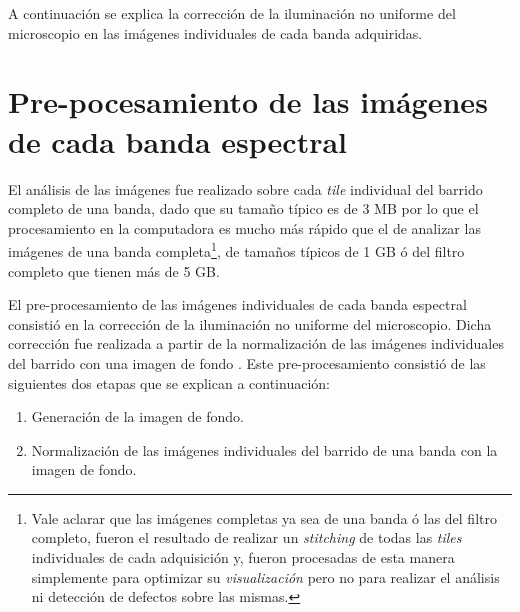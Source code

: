 A continuación se explica la corrección de la iluminación no uniforme del microscopio en las imágenes individuales de cada banda adquiridas.

\singlespacing
\section{Pre-pocesamiento de las imágenes de cada banda espectral }
\label{sec:preproc}

\hspace{0.5cm}El análisis de las imágenes fue realizado sobre cada \textit{tile} individual del barrido completo de una banda, dado que su tamaño típico es de 3 MB por lo que el procesamiento en la computadora es mucho más rápido que el de analizar las imágenes de una banda completa\footnote{Vale aclarar que las imágenes completas ya sea de una banda ó las del filtro completo, fueron el resultado de realizar un \textit{stitching} de todas las \textit{tiles} individuales de cada adquisición y, fueron procesadas de esta manera simplemente para optimizar su \textit{visualización} pero no para realizar el análisis ni detección de defectos sobre las mismas.}, de tamaños típicos de 1 GB ó del filtro completo que tienen más de 5 GB.

El pre-procesamiento de las imágenes individuales de cada banda espectral consistió en la corrección de la iluminación no uniforme del microscopio. Dicha corrección fue realizada a partir de la normalización de  las imágenes individuales del barrido con una imagen de fondo \cite{Nordenfelt}. Este pre-procesamiento consistió de las siguientes dos etapas que se explican a continuación:
\begin{enumerate}
\justifying
\item Generación de la imagen de fondo.
\item Normalización de las imágenes individuales del barrido de una banda con la imagen de fondo.
\end{enumerate}

\singlespacing

